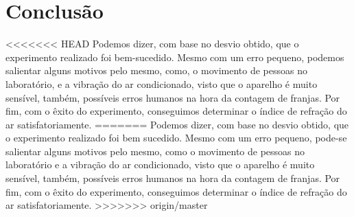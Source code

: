 \section{Conclusão}
<<<<<<< HEAD
Podemos dizer, com base no desvio obtido, que o experimento realizado foi bem-sucedido. Mesmo com um erro pequeno, podemos salientar alguns motivos pelo mesmo, como, o movimento de pessoas no laboratório, e a vibração do ar condicionado, visto que o aparelho é muito sensível, também, possíveis erros humanos na hora da contagem de franjas. Por fim, com o êxito do experimento, conseguimos determinar o índice de refração do ar satisfatoriamente. 
=======
Podemos dizer, com base no desvio obtido, que o experimento realizado foi bem sucedido. Mesmo com um erro pequeno, pode-se salientar alguns motivos pelo mesmo, como o movimento de pessoas no laboratório e a vibração do ar condicionado, visto que o aparelho é muito sensível, também, possíveis erros humanos na hora da contagem de franjas. Por fim, com o êxito do experimento, conseguimos determinar o índice de refração do ar satisfatoriamente. 
>>>>>>> origin/master
